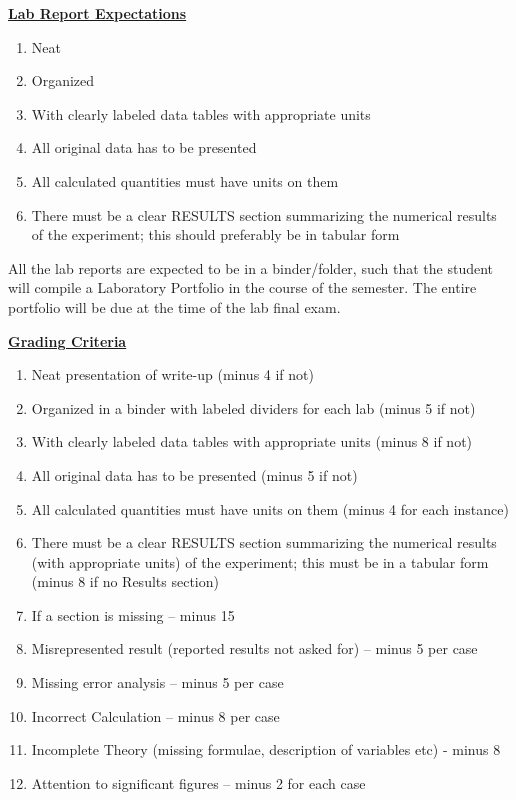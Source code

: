\documentclass[12pt]{article}
\begin{document}
\underline{\textbf{Lab Report Expectations}} \par
\begin{enumerate}
\item Neat
\item Organized
\item With clearly labeled data tables with appropriate units
\item All original data has to be presented
\item All calculated quantities must have units on them
\item There must be a clear RESULTS section summarizing the numerical results of the experiment; this should preferably be in tabular form
\end{enumerate}
All the lab reports are expected to be in a binder/folder, such that the student will compile a Laboratory Portfolio in the course of the semester.
The entire portfolio will be due at the time of the lab final exam.
\hfill \break

\underline{\textbf{Grading Criteria}} \par
\begin{enumerate}
\item Neat presentation of write-up (minus 4 if not)
\item Organized in a binder with labeled dividers for each lab (minus 5 if not)
\item With clearly labeled data tables with appropriate units (minus 8 if not)
\item All original data has to be presented (minus 5 if not)
\item All calculated quantities must have units on them (minus 4 for each instance)
\item There must be a clear RESULTS section summarizing the numerical results (with appropriate units) of the experiment; this must be in a tabular form (minus 8 if no Results section)
\item If a section is missing – minus 15
\item Misrepresented result (reported results not asked for) – minus 5 per case
\item Missing error analysis – minus 5 per case
\item Incorrect Calculation – minus 8 per case
\item Incomplete Theory (missing formulae, description of variables etc) - minus 8
\item Attention to significant figures – minus 2 for each case
\end{enumerate}
\end{document}
